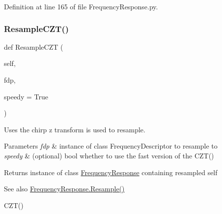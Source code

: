 Definition at line 165 of file Frequency\+Response.\+py.

\mbox{\label{classSignalIntegrity_1_1FrequencyDomain_1_1FrequencyResponse_1_1FrequencyResponse_af61ffacaaef319b5b0752778bfe522e6}} 
\subsubsection{\texorpdfstring{Resample\+C\+Z\+T()}{ResampleCZT()}}
{\footnotesize\ttfamily def Resample\+C\+ZT (\begin{DoxyParamCaption}\item[{}]{self,  }\item[{}]{fdp,  }\item[{}]{speedy = {\ttfamily True} }\end{DoxyParamCaption})}



Uses the chirp z transform is used to resample. 


\begin{DoxyParams}{Parameters}
{\em fdp} & instance of class Frequency\+Descriptor to resample to \\
\hline
{\em speedy} & (optional) bool whether to use the fast version of the C\+Z\+T() \\
\hline
\end{DoxyParams}
\begin{DoxyReturn}{Returns}
instance of class \hyperlink{classSignalIntegrity_1_1FrequencyDomain_1_1FrequencyResponse_1_1FrequencyResponse}{Frequency\+Response} containing resampled self 
\end{DoxyReturn}
\begin{DoxySeeAlso}{See also}
\hyperlink{classSignalIntegrity_1_1FrequencyDomain_1_1FrequencyResponse_1_1FrequencyResponse_a6aa7e8bdecb4f17e41d783d00a27fdd8}{Frequency\+Response.\+Resample()} 

C\+Z\+T() 
\end{DoxySeeAlso}


